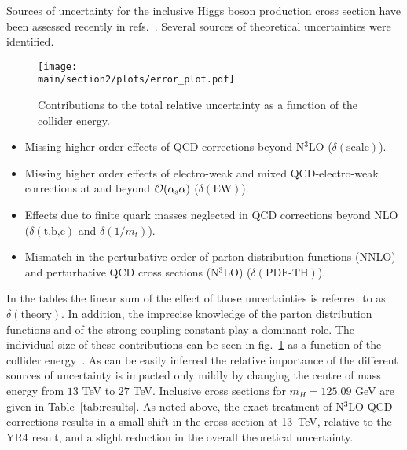 Sources of uncertainty for the inclusive Higgs boson production cross section have been assessed recently in refs.~\cite{Anastasiou:2016cez,Harlander:2016hcx,Bonvini:2016frm,deFlorian:2016spz}. 
Several sources of theoretical uncertainties were identified.
\begin{figure}[h]
\begin{center}
    \texttt{[image: \\main/section2/plots/error\_plot.pdf]}
    \caption{
    Contributions to the total relative uncertainty as a function of the collider energy.
        \label{fig:errorplot}}
        \end{center}
\end{figure}
\begin{itemize}
\item Missing higher order effects of QCD corrections beyond N$^3$LO ($\delta(\text{scale})$).
\item Missing higher order effects of electro-weak and mixed QCD-electro-weak corrections at and beyond $\mathcal{O}(\alpha_\text{s} \alpha)$ ($\delta(\text{EW})$).
\item Effects due to finite quark masses neglected in QCD corrections beyond NLO ($\delta(\text{t,b,c})$ and $\delta(1/m_t)$).
\item Mismatch in the perturbative order of parton distribution functions (NNLO) and perturbative QCD cross sections (N$^3$LO) ($\delta(\text{PDF-TH})$).
\end{itemize}
In the tables the linear sum of the effect of those uncertainties
is referred to as $\delta(\text{theory})$.  In addition, the imprecise
knowledge of the parton distribution functions and of the strong coupling
constant play a dominant role.  The individual size of these
contributions can be seen in fig.~\ref{fig:errorplot} as a function of
the collider energy~\cite{Dulat:2018rbf}.  As can be easily inferred
the relative importance of the different sources of uncertainty is
impacted only mildly by changing the centre of mass energy from $13$
TeV to $27$ TeV.  Inclusive cross sections for
$m_H=125.09$ GeV are given in Table~\ref{tab:results}. As noted above, the
exact treatment of N$^3$LO QCD corrections results in a
small shift in the cross-section at 13~TeV, relative to the YR4 result, and
a slight reduction in the overall theoretical uncertainty.
